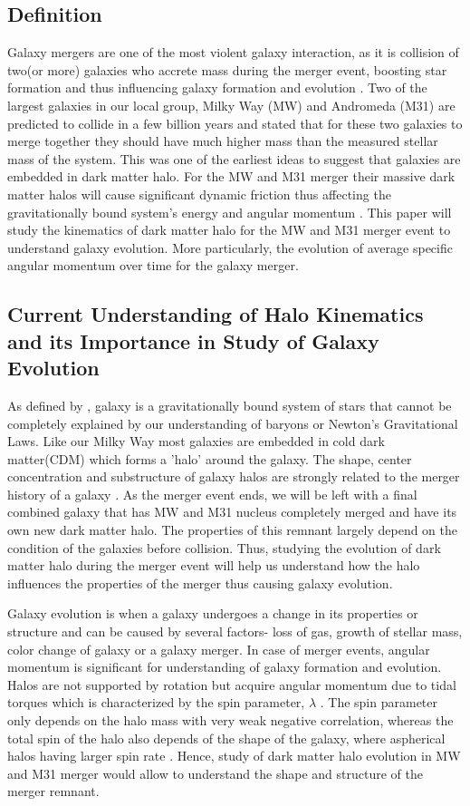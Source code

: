 \documentclass[twocolumn]{aastex631}
\begin{document}
\subsection{Definition} 
Galaxy mergers are one of the most violent galaxy interaction, as it is collision of two(or more) galaxies who accrete mass during the merger event, boosting star formation and thus influencing galaxy formation and evolution \citep{Bertone2009}. Two of the largest galaxies in our local group, Milky Way (MW) and Andromeda (M31) are predicted to collide in a few billion years and \citet{Kahn1959} stated that for these two galaxies to merge together they should have much higher mass than the measured stellar mass of the system. This was one of the earliest ideas to suggest that galaxies are embedded in dark matter halo. For the MW and M31 merger their massive dark matter halos will cause significant dynamic friction thus affecting the gravitationally bound system's energy and angular momentum \citep{Cox2008}. This paper will study the kinematics of dark matter halo for the MW and M31 merger event to understand galaxy evolution. More particularly, the evolution of average specific angular momentum over time for the galaxy merger.  

\subsection{Current Understanding of Halo Kinematics and its Importance in Study of Galaxy Evolution}
As defined by \citet{Willman2012}, galaxy is a gravitationally bound system of stars that cannot be completely explained by our understanding of baryons or Newton's Gravitational Laws. Like our Milky Way most galaxies are embedded in cold dark matter(CDM) which forms a 'halo' around the galaxy. The shape, center concentration and substructure of galaxy halos are strongly related to the merger history of a galaxy \citep{Drakos2019a}. As the merger event ends, we will be left with a final combined galaxy that has MW and M31 nucleus completely merged and have its own new dark matter halo. The properties of this remnant largely depend on the condition of the galaxies before collision. Thus, studying the evolution of dark matter halo during the merger event will help us understand how the halo influences the properties of the merger thus causing galaxy evolution. 

Galaxy evolution is when a galaxy undergoes a change in its properties or structure and can be caused by several factors- loss of gas, growth of stellar mass, color change of galaxy or a galaxy merger. In case of merger events, angular momentum is significant for understanding of galaxy formation and evolution. Halos are not supported by rotation but acquire angular momentum due to tidal torques which is characterized by the spin parameter, $\lambda$ \citep{Frenk2012}. The spin parameter only depends on the halo mass with very weak negative correlation, whereas the total spin of the halo also depends of the shape of the galaxy, where aspherical halos having larger spin rate \citep{Frenk2012}. Hence, study of dark matter halo evolution in MW and M31 merger would allow to understand the shape and structure of the merger remnant.
\end{document}
